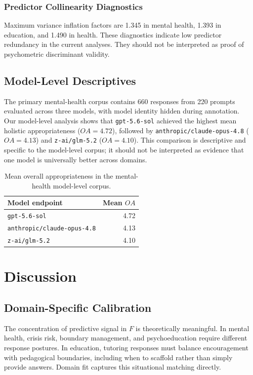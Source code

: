 \documentclass[manuscript,review,anonymous]{acmart}
\begin{document}
\subsubsection{Predictor Collinearity Diagnostics}

Maximum variance inflation factors are 1.345 in mental health, 1.393 in education, and 1.490 in health. These diagnostics indicate low predictor redundancy in the current analyses. They should not be interpreted as proof of psychometric discriminant validity.

\subsection{Model-Level Descriptives}

The primary mental-health corpus contains 660 responses from 220 prompts evaluated across three models, with model identity hidden during annotation. Our model-level analysis shows that \texttt{gpt-5.6-sol} achieved the highest mean holistic appropriateness ($OA=4.72$), followed by \texttt{anthropic/claude-opus-4.8} ($OA=4.13$) and \texttt{z-ai/glm-5.2} ($OA=4.10$). This comparison is descriptive and specific to the model-level corpus; it should not be interpreted as evidence that one model is universally better across domains.

\begin{table}[t]
\centering
\small
\caption{Mean overall appropriateness in the mental-health model-level corpus.}
\label{tab:model-oa}
\begin{tabular}{lr}
\toprule
Model endpoint & Mean $OA$ \\
\midrule
\texttt{gpt-5.6-sol} & 4.72 \\
\texttt{anthropic/claude-opus-4.8} & 4.13 \\
\texttt{z-ai/glm-5.2} & 4.10 \\
\bottomrule
\end{tabular}
\end{table}

\section{Discussion}

\subsection{Domain-Specific Calibration}

The concentration of predictive signal in $F$ is theoretically meaningful. In mental health, crisis risk, boundary management, and psychoeducation require different response postures. In education, tutoring responses must balance encouragement with pedagogical boundaries, including when to scaffold rather than simply provide answers. Domain fit captures this situational matching directly.
\end{document}
